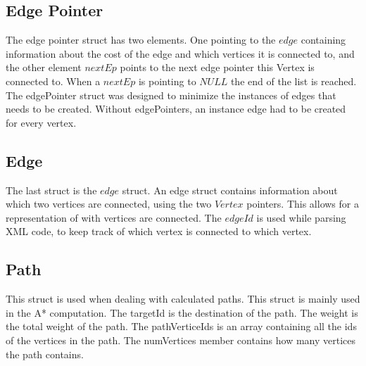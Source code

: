 \begin{minipage}{\linewidth}
\subsection{Edge Pointer}

The edge pointer struct has two elements. One pointing to the $edge$ containing information about the cost of the edge and which vertices it is connected to, and the other element $nextEp$ points to the next edge pointer this Vertex is connected to. When a $nextEp$ is pointing to $NULL$ the end of the list is reached. The edgePointer struct was designed to minimize the instances of edges that needs to be created. Without edgePointers, an instance edge had to be created for every vertex.


 \label{ep_struct}

\end{minipage}



\begin{minipage}{\linewidth}
\subsection{Edge}
The last struct is the $edge$ struct. An edge struct contains information about which two vertices are connected, using the two $Vertex$ pointers. This allows for a representation of with vertices are connected. The $edgeId$ is used while parsing XML code, to keep track of which vertex is connected to which vertex.

 \label{edge_struct}
\end{minipage}

\begin{minipage}{\linewidth}
\subsection{Path}
This struct is used when dealing with calculated paths. This struct is mainly used in the A* computation. The targetId is the destination of the path. The weight is the total weight of the path. The pathVerticeIds is an array containing all the ids of the vertices in the path. The numVertices member contains how many vertices the path contains.

 \label{path_struct}
\end{minipage}

